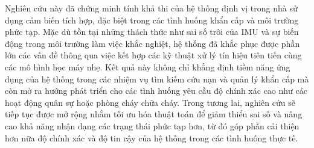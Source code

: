 Nghiên cứu này đã chứng minh tính khả thi của hệ thống định vị trong nhà sử dụng cảm biến tích hợp, đặc biệt trong các tình huống khẩn cấp và môi trường phức tạp. Mặc dù tồn tại những thách thức như sai số trôi của IMU và sự biến động trong môi trường làm việc khắc nghiệt, hệ thống đã khắc phục được phần lớn các vấn đề thông qua việc kết hợp các kỹ thuật xử lý tín hiệu tiên tiến cùng các mô hình học máy nhẹ. Kết quả này không chỉ khẳng định tiềm năng ứng dụng của hệ thống trong các nhiệm vụ tìm kiếm cứu nạn và quản lý khẩn cấp mà còn mở ra hướng phát triển cho các tình huống yêu cầu độ chính xác cao như các hoạt động quân sự hoặc phòng cháy chữa cháy. Trong tương lai, nghiên cứu sẽ tiếp tục được mở rộng nhằm tối ưu hóa thuật toán để giảm thiểu sai số và nâng cao khả năng nhận dạng các trạng thái phức tạp hơn, từ đó góp phần cải thiện hơn nữa độ chính xác và độ tin cậy của hệ thống trong các tình huống thực tế.